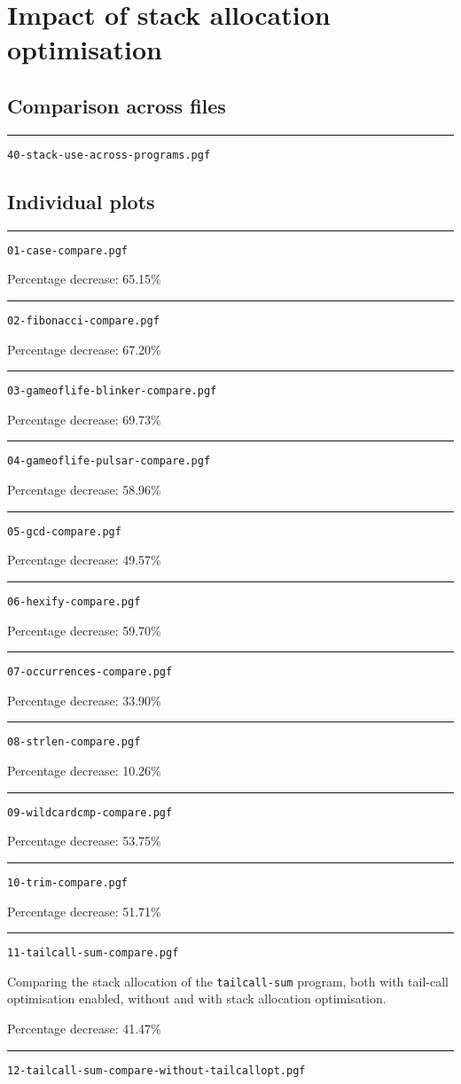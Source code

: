 \documentclass{article}
\newcommand{\plot}[1]{
\rule{\textwidth}{1pt}
\texttt{#1}

\fbox{\resizebox{\textwidth}{!}{}}
}
\begin{document}
\section{Impact of stack allocation optimisation}

\subsection{Comparison across files}

\plot{40-stack-use-across-programs.pgf}

\subsection{Individual plots}

\plot{01-case-compare.pgf}

Percentage decrease: 65.15\%


\plot{02-fibonacci-compare.pgf}

Percentage decrease: 67.20\%

\plot{03-gameoflife-blinker-compare.pgf}

Percentage decrease: 69.73\%

\plot{04-gameoflife-pulsar-compare.pgf}

Percentage decrease: 58.96\%

\plot{05-gcd-compare.pgf}

Percentage decrease: 49.57\%

\plot{06-hexify-compare.pgf}

Percentage decrease: 59.70\%

\plot{07-occurrences-compare.pgf}

Percentage decrease: 33.90\%

\plot{08-strlen-compare.pgf}

Percentage decrease: 10.26\%

\plot{09-wildcardcmp-compare.pgf}

Percentage decrease: 53.75\%


\plot{10-trim-compare.pgf}

Percentage decrease: 51.71\%

\plot{11-tailcall-sum-compare.pgf}

Comparing the stack allocation of the \texttt{tailcall-sum} program, both with tail-call optimisation enabled, without and with stack allocation optimisation.

Percentage decrease: 41.47\%

\plot{12-tailcall-sum-compare-without-tailcallopt.pgf}
\end{document}
